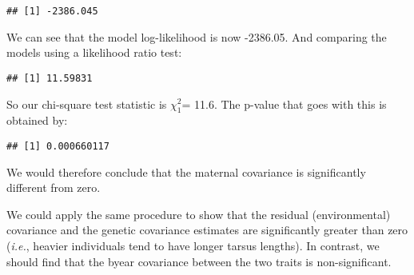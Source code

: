 \documentclass[12pt,]{book}
\newenvironment{Shaded}{\begin{snugshade}}{\end{snugshade}}
\newcommand{\DecValTok}[1]{\textcolor[rgb]{0.00,0.00,0.81}{#1}}
\newcommand{\KeywordTok}[1]{\textcolor[rgb]{0.13,0.29,0.53}{\textbf{#1}}}
\newcommand{\NormalTok}[1]{#1}
\newcommand{\OperatorTok}[1]{\textcolor[rgb]{0.81,0.36,0.00}{\textbf{#1}}}
\newcommand{\StringTok}[1]{\textcolor[rgb]{0.31,0.60,0.02}{#1}}
\begin{document}
\begin{Shaded}
\end{Shaded}

\begin{verbatim}
## [1] -2386.045
\end{verbatim}

We can see that the model log-likelihood is now -2386.05.
And comparing the models using a likelihood ratio test:

\begin{Shaded}
\end{Shaded}

\begin{verbatim}
## [1] 11.59831
\end{verbatim}

So our chi-square test statistic is \(\chi^2_1\)= 11.6.
The p-value that goes with this is obtained by:

\begin{Shaded}
\end{Shaded}

\begin{verbatim}
## [1] 0.000660117
\end{verbatim}

We would therefore conclude that the maternal covariance is significantly different from zero.

We could apply the same procedure to show that the residual (environmental) covariance and the genetic covariance estimates are significantly greater than zero (\emph{i.e.}, heavier individuals tend to have longer tarsus lengths). In contrast, we should find that the byear covariance between the two traits is non-significant.
\end{document}
